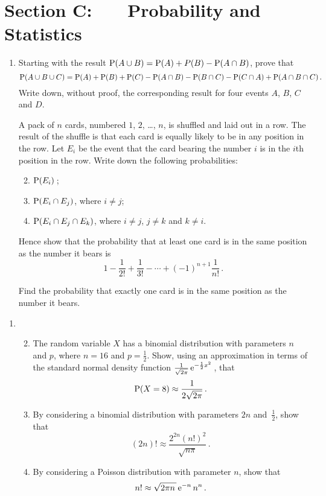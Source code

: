 \documentclass[a4, 11pt]{report}
\newlength{\qspace}
\newcounter{qnumber}
\newenvironment{question}%
 {\vspace{\qspace}
  \begin{enumerate}[\bfseries 1\quad][10]%
    \setcounter{enumi}{\value{qnumber}}%
    \item%
 }
{
  \end{enumerate}
  \filbreak
  \stepcounter{qnumber}
 }
\newenvironment{questionparts}[1][1]%
 {
  \begin{enumerate}[\bfseries (i)]%
    \setcounter{enumii}{#1}
    \addtocounter{enumii}{-1}
    \setlength{\itemsep}{5mm}
    \setlength{\parskip}{8pt}
 }
 {
  \end{enumerate}
 }
\def\e{{\rm e}}
\def\P{{\rm P}}
\begin{document}
\section*{Section C: \ \ \ Probability and Statistics}
\begin{question}
Starting with the result $\P(A\cup B) = \P(A)+P(B) - \P(A\cap B)$, prove
that 
\[
\P(A\cup B\cup C) = \P(A)+\P(B)+\P(C)  
- \P(A\cap B) - \P(B\cap C) - \P(C \cap A)
+ \P(A\cap B\cap C)
\,.
\] 
Write down, without proof, the  corresponding result for four events
$A$, $B$, $C$ and $D$.

A pack of $n$ cards, numbered $1$, $2$, \ldots , $n$, is shuffled 
and laid out in a row. The result of the shuffle is that each card is 
equally likely to be in any position in the row. Let $E_i$ be
the event that the card bearing the number $i$  is in the $i$th position in the row.
Write down the following probabilities:
\begin{questionparts}
\item $\P(E_i)$\,;
\item $\P(E_i\cap E_j)$, where $i\ne j$;
\item  $\P(E_i\cap E_j\cap E_k)$, where $i\ne j$, $j\ne k$ and $k\ne i$.
\end{questionparts} 
Hence show that the probability that at least one card is in the same position
as the number it bears is
\[
1 - \frac 1 {2!} + \frac 1{3!} - \cdots + (-1)^{n+1} \frac 1 {n!}\,.
\]

Find the probability that exactly one card is in the same position
as the number it bears.

\end{question}





\begin{question}
\begin{questionparts}
\item
  The random variable $X$ has a binomial distribution with parameters 
$n$ and
$p$, where $n=16$ and 
$p=\frac12$. 
Show, using an approximation in terms of the 
 standard normal
density function 
$\displaystyle
\tfrac{1}{\sqrt{2\pi}} \, \e ^{-\frac12 x^2}
$\,, that 
\[
\P(X=8) \approx \frac 1{2\sqrt{2\pi}}
\,.
\]
\item By considering a binomial 
distribution with parameters $2n$ and~$\frac12$, show that 
\[
(2n)! \approx \frac {2^{2n} (n!)^2}{\sqrt{n\pi}} \,.
\]
\item By considering a Poisson  distribution with parameter $n$, 
 show that  
\[
n! \approx \sqrt{2\pi n\, } \, \e^{-n} \, n^n \,.
\]

\end{questionparts}

\end{question}
\end{document}
